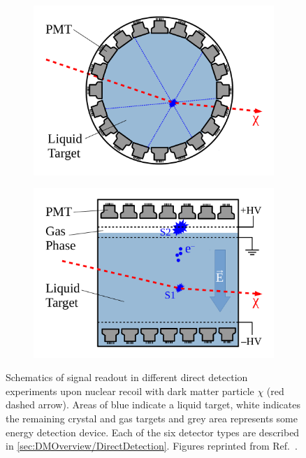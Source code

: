 \begin{figure}[!ht]
\begin{subfigure}{0.49\textwidth}
         \includegraphics[width=\textwidth]{figures/DMOverview/singlephase.pdf}
         \caption{}
         \label{fig:DMOverview/singlephase}
     \end{subfigure}
     \hfill
     \begin{subfigure}{0.49\textwidth}
         \centering
         \includegraphics[width=\textwidth]{figures/DMOverview/dualphase.pdf}
         \caption{}
         \label{fig:DMOverview/dualphase}
     \end{subfigure}
     \caption[Schematics of signal readout in different direct detection experiments.]{Schematics of signal readout in different direct detection experiments upon nuclear recoil with dark matter particle $\chi$ (red dashed arrow). Areas of blue indicate a liquid target, white indicates the remaining crystal and gas targets and grey area represents some energy detection device. Each of the six detector types are described in \autoref{sec:DMOverview/DirectDetection}. Figures reprinted from Ref.~\cite{Schumann:2019eaa}.}
     \label{fig:DMOverview/DDSetups}
\end{figure}

